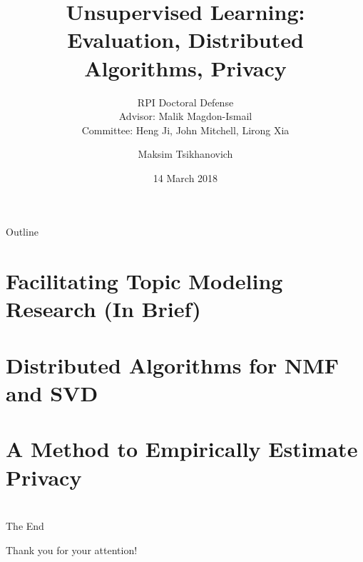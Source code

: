 \documentclass[pdf]{beamer}
\begin{document}
\title{Unsupervised Learning: Evaluation, Distributed Algorithms, Privacy}
\subtitle{RPI Doctoral Defense\\
Advisor: Malik Magdon-Ismail\\
Committee: Heng Ji, John Mitchell, Lirong Xia}
\date{14 March 2018}
\author{Maksim Tsikhanovich}
{
\begin{frame}
\titlepage

\end{frame}
{\small
\begin{frame}{Outline}

\tableofcontents[subsectionstyle=hide]
\end{frame}
}
\addtocounter{framenumber}{-2}
}



\section{Facilitating Topic Modeling Research (In Brief)}


\section{Distributed Algorithms for NMF and SVD}


\section{A Method to Empirically Estimate Privacy}


\section*{}
{

\addtocounter{framenumber}{-1}

\begin{frame}{The End}
\begin{center}\Large Thank you for your attention!\end{center}
\vspace{1em}

\begin{center}
\begin{minipage}{0.8\textwidth}\tableofcontents[currentsection]
\end{minipage}
\end{center}

\end{frame}
}
\end{document}
